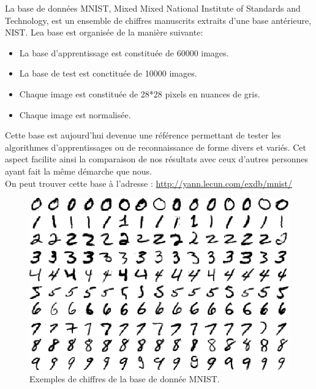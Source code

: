 \documentclass[a4paper,oneside]{report}
\begin{document}
                La base de données MNIST, Mixed Mixed National Institute of Standards and Technology, est un ensemble de chiffres manuscrits extraits d'une base antérieure, NIST. Lea base est organisée de la manière suivante:

                \begin{itemize}
                    \item La base d'apprentissage est constituée de 60000 images.
                    \item La base de test est conctituée de 10000 images.
                    \item Chaque image est constituée de 28*28 pixels en nuances de gris.
                    \item Chaque image est normalisée.\\
                \end{itemize}

                Cette base est aujourd'hui devenue une référence permettant de tester les algorithmes d'apprentissages ou de reconnaissance de forme divers et variés. Cet aspect facilite ainsi la comparaison de nos résultats avec ceux d'autres personnes ayant fait la même démarche que nous.\\

                On peut trouver cette base à l'adresse : \url{http://yann.lecun.com/exdb/mnist/}

                \begin{figure}
                    \begin{center}
                        \includegraphics{Images/mnist-01.png}
                    \end{center}
                    \caption{Exemples de chiffres de la base de donnée MNIST.}
                \end{figure}
\end{document}
